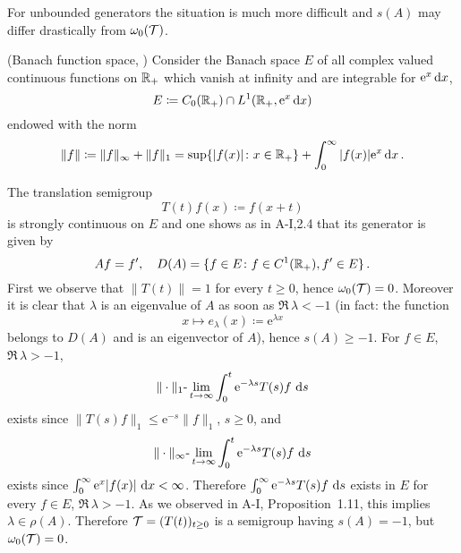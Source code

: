 For unbounded generators the situation is much more difficult and $s(A)$ may differ drastically from $\omega_{0}(\mathcal{T})$.
\begin{example}\label{ex:a3-1.3}
(Banach function space, \citet{greinervoigtwolff:1981})
Consider the Banach space $E$ of all complex valued continuous functions on $\mathbb{R}_{+}$ which vanish at infinity and are integrable for $\mathrm{e}^{x}\mathop{}\!\mathrm{d}{x}$, \ie 
\[
    E \coloneqq C_{0}(\mathbb{R}_{+}) \cap L^{1}(\mathbb{R}_{+}, \mathrm{e}^{x}\mathop{}\!\mathrm{d}{x})
\]
endowed with the norm
\[
    \|f\| \coloneqq \|f\|_{\infty} + \|f\|_{1} = \sup\{|f(x)| \colon x \in \mathbb{R}_{+}\} + \int_{0}^{\infty} |f(x)|\mathrm{e}^{x} \mathop{}\!\mathrm{d}{x}\,.
\]
\end{example}
The translation semigroup
\[
    T(t)f(x) \coloneqq f(x+t)
\]
is strongly continuous on $E$ and one shows as in A-I,2.4 that its generator is given by
\[
    Af = f', \quad D(A) = \{ f \in E \colon f \in C^{1}(\mathbb{R}_{+}), f' \in E \}\,.
\]
First we observe that $\|T(t)\| = 1$ for every $t \geq 0$, hence $\omega_{0}(\mathcal{T}) = 0$.
Moreover it is clear that $\lambda$ is an eigenvalue of $A$ as soon as $\Re\,\lambda < -1$ (in fact: the function
\[
    x \mapsto e_{\lambda}(x) \coloneqq \mathrm{e}^{\lambda x}
\]
belongs to $D(A)$ and is an eigenvector of $A$), hence $s(A) \geq -1$.
For $f \in E$, $\Re\,\lambda > -1$,
\[
    \|\cdot\|_{1}\text{-}\lim_{t \to \infty} \int_{0}^{t} \mathrm{e}^{-\lambda s}T(s)f \, \mathop{}\!\mathrm{d}{s}
\]
exists since $\|T(s)f\|_{1} \leq \mathrm{e}^{-s}\|f\|_{1}$, $s \geq 0$, and
\[
    \|\cdot\|_{\infty}\text{-}\lim_{t \to \infty} \int_{0}^{t} \mathrm{e}^{-\lambda s}T(s)f \, \mathop{}\!\mathrm{d}{s}
\]
exists since $\int_{0}^{\infty} \mathrm{e}^{x}|f(x)| \, \mathop{}\!\mathrm{d}{x} < \infty$.
Therefore $\int_{0}^{\infty} \mathrm{e}^{-\lambda s}T(s)f \, \mathop{}\!\mathrm{d}{s}$ exists in $E$ for every $f \in E$, $\Re\,\lambda > -1$.
As we observed in A-I, Proposition~1.11, this implies $\lambda \in \rho(A)$.
Therefore $\mathcal{T} = (T(t))_{t\geq 0}$ is a semigroup having $s(A) = -1$, but $\omega_{0}(\mathcal{T}) = 0$.

